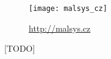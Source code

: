 



\begin{wrapfigure}{r}{0.4\textwidth}
	\texttt{[image: malsys\_cz]}
	\caption{\url{http://malsys.cz}}
	\label{fig:malsysQr}
\end{wrapfigure}

[TODO]





























